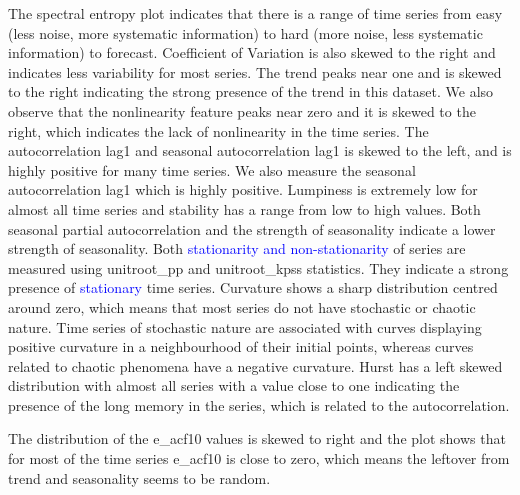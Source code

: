 \documentclass[preprint, 3p,
authoryear]{elsarticle} %
\begin{document}
The spectral entropy plot indicates that there is a range of time series
from easy (less noise, more systematic information) to hard (more noise,
less systematic information) to forecast. Coefficient of Variation is
also skewed to the right and indicates less variability for most series.
The trend peaks near one and is skewed to the right indicating the
strong presence of the trend in this dataset. We also observe that the
nonlinearity feature peaks near zero and it is skewed to the right,
which indicates the lack of nonlinearity in the time series. The
autocorrelation lag1 and seasonal autocorrelation lag1 is skewed to the
left, and is highly positive for many time series. We also measure the
seasonal autocorrelation lag1 which is highly positive. Lumpiness is
extremely low for almost all time series and stability has a range from
low to high values. Both seasonal partial autocorrelation and the
strength of seasonality indicate a lower strength of seasonality. Both
\textcolor{blue}{stationarity and non-stationarity} of series are
measured using unitroot\_pp and unitroot\_kpss statistics. They indicate
a strong presence of \textcolor{blue}{stationary} time series. Curvature
shows a sharp distribution centred around zero, which means that most
series do not have stochastic or chaotic nature. Time series of
stochastic nature are associated with curves displaying positive
curvature in a neighbourhood of their initial points, whereas curves
related to chaotic phenomena have a negative curvature. Hurst has a left
skewed distribution with almost all series with a value close to one
indicating the presence of the long memory in the series, which is
related to the autocorrelation.

The distribution of the e\_acf10 values is skewed to right and the plot
shows that for most of the time series e\_acf10 is close to zero, which
means the leftover from trend and seasonality seems to be random.
\end{document}
